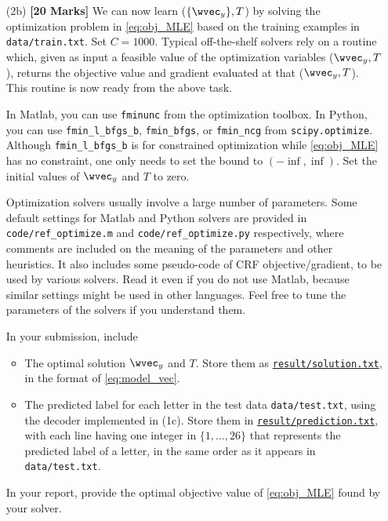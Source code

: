 \documentclass[11pt]{report}
\begin{document}
\begin{itemize}
		{\bf Provide} the value of $\frac{1}{n} \sum_{i=1}^n \log p(\yvec^i | X^i)$ for this case in your report.
		
		For your reference,
		in your instructor's Matlab implementation (65 lines),
		it takes 5 seconds to compute the gradient on the whole training set.
		Single core.
		
		
		\item[(2b)] {\bf [20 Marks]} We can now learn ($\{\wvec_y\}, T$) by solving the optimization problem in \eqref{eq:obj_MLE} based on the training examples in \verb#data/train.txt#.
		Set $C = 1000$.
		Typical off-the-shelf solvers rely on a routine which, given as input a feasible value of the optimization variables ($\wvec_y, T$), returns the objective value and gradient evaluated at that ($\wvec_y, T$). This routine is now ready from the above task.
		
		In Matlab, you can use \verb#fminunc# from the optimization toolbox. In Python, you can use \verb#fmin_l_bfgs_b#, \verb#fmin_bfgs#, or \verb#fmin_ncg# from \verb#scipy.optimize#.
		Although \verb#fmin_l_bfgs_b# is for constrained optimization while \eqref{eq:obj_MLE} has no constraint, one only needs to set the bound to $(-\inf, \inf)$.  Set the initial values of $\wvec_y$ and $T$ to zero.
		
		Optimization solvers usually involve a large number of parameters.
		Some default settings for Matlab and Python solvers are provided in \verb#code/ref_optimize.m# and \verb#code/ref_optimize.py# respectively,
		where comments are included on the meaning of the parameters and other heuristics.
		It also includes some pseudo-code of CRF objective/gradient,
		to be used by various solvers.
		Read it even if you do not use Matlab, because similar settings might be used in other languages.
		Feel free to tune the parameters of the solvers if you understand them.
		
		In your submission, include
		\begin{itemize}
			\item The optimal solution $\wvec_y$ and $T$.  Store them as \underline{\tt{result/solution.txt}}, in the format of \eqref{eq:model_vec}.
			\item The predicted label for each letter in the test data \verb#data/test.txt#, using the decoder implemented in (1c).
			Store them in \underline{\tt{result/prediction.txt}},
			with each line having one integer in $\{1,\ldots, 26\}$ that represents the predicted label of a letter, in the same order as it appears in \verb#data/test.txt#.
		\end{itemize}
		In your report, provide the optimal objective value of \eqref{eq:obj_MLE} found by your solver.
	\end{itemize}
	
\end{document}
